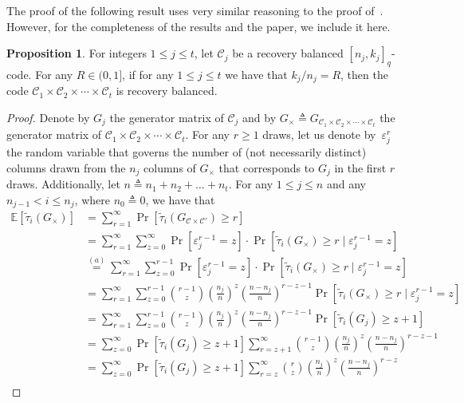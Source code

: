 \documentclass[11pt,a4paper,reqno,twoside]{amsart}
\theoremstyle{definition}
\newtheorem{proposition}{Proposition}
\newcommand{\E}{\mathbb{E}}
\newcommand{\mC}{\mathcal{C}}
\begin{document}
The proof of the following result uses very similar reasoning to the proof of~\cite[Proposition~11]{bar2023cover}. However, for the completeness of the results and the paper, we include it here. 

\begin{proposition} \label{prop:cart}
    For integers $1\le j\le t$, let $\mC_j$ be a recovery balanced $[n_j,k_j]_q$-code. For any $R\in(0,1]$, if for any $1\le j\le t$ we have that $k_j/n_j=R$, then the code $\mC_1 \times \mC_2 \times \cdots \times \mC_t$ is recovery balanced.
\end{proposition}
\begin{proof}
Denote by $G_j$ the generator matrix of $\mC_j$ and by $G_\times\triangleq G_{\mC_1 \times \mC_2 \times \cdots \times \mC_t}$ the generator matrix of $\mC_1 \times \mC_2 \times \cdots \times \mC_t$. For any $r \ge 1$ draws, let us denote by~$\varepsilon_j^r$  the random variable that governs the number of (not necessarily distinct) columns drawn from the  $n_j$ columns of $G_\times$ that corresponds to $G_j$ in the first $r$ draws. Additionally, let $n\triangleq n_1+n_2+\ldots+n_t$. For any $1\le j\le n$ and any $n_{j-1}< i\le n_j$, where $n_{0}\triangleq 0$, we have that
\begin{align*}
\E [\widetilde{\tau}_i (G_{\times})] & = \sum_{r=1}^\infty \Pr[ \widetilde{\tau}_i(G_{\mC\times\mC'}) \ge r] \\ 
& 
= \sum_{r=1}^\infty \sum_{z=0}^{\infty} \Pr [\varepsilon^{r-1}_j = z]\cdot \Pr\left[\widetilde{\tau}_i(G_{\times}) \ge r \mid \varepsilon^{r-1}_j = z\right]
\\
& \stackrel{(a)}{=} \sum_{r=1}^\infty \sum_{z=0}^{r-1} \Pr[\varepsilon^{r-1}_j = z]\cdot \Pr\left[\widetilde{\tau}_i(G_{\times}) \ge r \mid \varepsilon^{r-1}_j = z\right] \\ 
& = \sum_{r=1}^\infty \sum_{z=0}^{r-1} \binom{r-1}{z} \left(\frac{n_j}{n}\right)^z \left(\frac{n-n_j}{n}\right)^{r-z-1} \Pr\left[\widetilde{\tau}_i(G_{\times}) \ge r \mid \varepsilon_j^{r-1} = z\right]\\
& =   \sum_{r=1}^\infty \sum_{z=0}^{r-1} \binom{r-1}{z} \left(\frac{n_j}{n}\right)^z \left(\frac{n-n_j}{n}\right)^{r-z-1}  \Pr \left[ \widetilde{\tau}_i(G_j) \ge z+1\right] \\
& = \sum_{z=0}^\infty \Pr \left[ \widetilde{\tau}_i (G_j ) \ge z+1 \right] \sum_{r=z+1}^{\infty} \binom{r-1}{z} \left(\frac{n_j}{n}\right)^z \left(\frac{n-n_j}{n}\right)^{r-z-1}  \\ 
& = \sum_{z=0}^\infty \Pr \left[ \widetilde{\tau}_i (G_j ) \ge z+1 \right] \sum_{r=z}^{\infty} \binom{r}{z} \left(\frac{n_j}{n}\right)^z \left(\frac{n-n_j}{n}\right)^{r-z} \\ 

\end{align*}
\end{proof}
\end{document}
